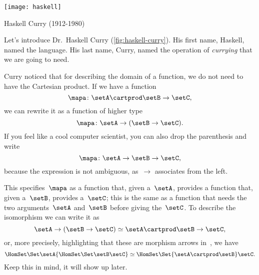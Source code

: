 \begin{marginfigure}
    \texttt{[image: haskell]}
    \caption{Haskell Curry (1912-1980)}
    \label{fig:haskell-curry}
\end{marginfigure}

Let's introduce Dr.~Haskell Curry (\cref{fig:haskell-curry}).
His first name, Haskell, named the language.
His last name, Curry, named the operation of \emph{currying} that we are going to need.

Curry noticed that for describing the domain of a function, we do not need to have the Cartesian product.
If we have a function
%
\begin{equation}
    \label{eq:currying-1}
    \mapa \colon \setA \cartprod \setB \to \setC,
\end{equation}
%
we can rewrite it as a function of higher type
%
\begin{equation}
    \label{eq:currying-2}
    \mapa \colon \setA \to ( \setB \to \setC).
\end{equation}
%
If you feel like a cool computer scientist, you can also drop the parenthesis and write
%
\begin{equation}
    \label{eq:currying-3}
    \mapa \colon \setA \to \setB \to \setC,
\end{equation}
%
because the expression is not ambiguous, as~$\to$ associates from the left.


This specifies~$\mapa$ as a function that, given a~$\setA$, provides a function that, given a~$\setB$, provides a~$\setC$;
this is the same as a function that needs the two arguments~$\setA$ and~$\setB$ before giving the~$\setC$.
To describe the isomorphism we can write it as
\begin{equation}
    \label{eq:currying-iso-1}
    \setA \to ( \setB \to \setC) \simeq  \setA \cartprod \setB \to \setC,
\end{equation}
or, more precisely, highlighting that these are morphism arrows in~\Set, we have
\begin{equation}
    \label{eq:currying-iso-2}
    \HomSet\Set\setA{\HomSet\Set\setB\setC} \simeq \HomSet\Set{\setA \cartprod \setB}\setC.
\end{equation}
Keep this in mind, it will show up later.

